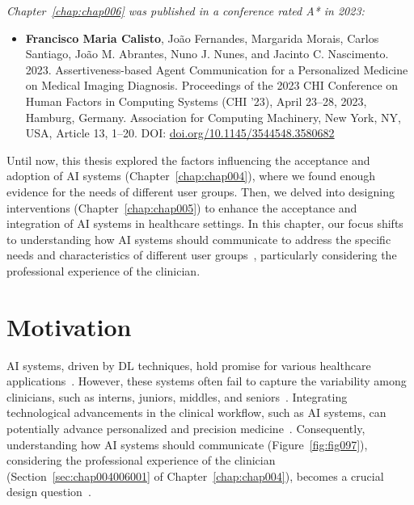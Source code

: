 \clearpage
\label{chap:chap006}

\noindent
{\it Chapter~\ref{chap:chap006} was published in a conference rated A* in 2023:}

\vspace{0.5mm}

\begin{itemize}
\item {\bf Francisco Maria Calisto}, Jo\~{a}o Fernandes, Margarida Morais, Carlos Santiago, Jo\~{a}o M. Abrantes, Nuno J. Nunes, and Jacinto C. Nascimento. 2023. Assertiveness-based Agent Communication for a Personalized Medicine on Medical Imaging Diagnosis. Proceedings of the 2023 CHI Conference on Human Factors in Computing Systems (CHI '23), April 23--28, 2023, Hamburg, Germany. Association for Computing Machinery, New York, NY, USA, Article 13, 1–20. DOI: \href{https://doi.org/10.1145/3544548.3580682}{doi.org/10.1145/3544548.3580682}
\end{itemize}

Until now, this thesis explored the factors influencing the acceptance and adoption of \ac{AI} systems (Chapter~\ref{chap:chap004}), where we found enough evidence for the needs of different user groups.
Then, we delved into designing interventions (Chapter~\ref{chap:chap005}) to enhance the acceptance and integration of \ac{AI} systems in healthcare settings.
In this chapter, our focus shifts to understanding how \ac{AI} systems should communicate to address the specific needs and characteristics of different user groups~\cite{10.1145/3544548.3580682}, particularly considering the professional experience of the clinician.

\section{Motivation}
\label{sec:chap006001}

\ac{AI} systems, driven by \ac{DL} techniques, hold promise for various healthcare applications~\cite{CALISTO2022102285, Hannun2019, Ruamviboonsuk2019}.
However, these systems often fail to capture the variability among clinicians, such as interns, juniors, middles, and seniors~\cite{Uddin2019}.
Integrating technological advancements in the clinical workflow, such as \ac{AI} systems, can potentially advance personalized and precision medicine~\cite{HO2020497, Wetzstein2020}.
Consequently, understanding how \ac{AI} systems should communicate (Figure~\ref{fig:fig097}), considering the professional experience of the clinician (Section~\ref{sec:chap004006001} of Chapter~\ref{chap:chap004}), becomes a crucial design question~\cite{pacheco2019alignment}.

